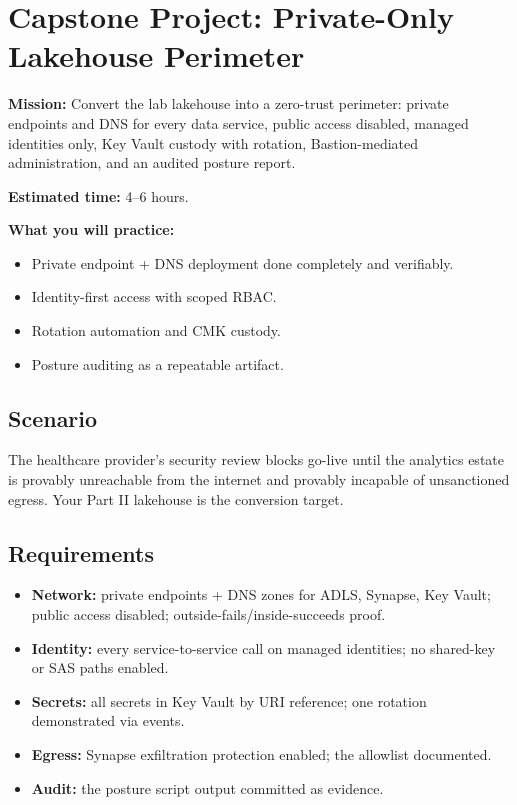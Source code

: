 \section{Capstone Project: Private-Only Lakehouse Perimeter}\label{sec:ch21-capstone}

\begin{capstonebox}
\textbf{Mission:} Convert the lab lakehouse into a zero-trust perimeter: private endpoints and DNS for every data service, public access disabled, managed identities only, Key Vault custody with rotation, Bastion-mediated administration, and an audited posture report.

\textbf{Estimated time:} 4--6 hours.

\textbf{What you will practice:}
\begin{itemize}
    \item Private endpoint + DNS deployment done completely and verifiably.
    \item Identity-first access with scoped RBAC.
    \item Rotation automation and CMK custody.
    \item Posture auditing as a repeatable artifact.
\end{itemize}
\end{capstonebox}

\subsection*{Scenario}
The healthcare provider's security review blocks go-live until the analytics estate is provably unreachable from the internet and provably incapable of unsanctioned egress. Your Part II lakehouse is the conversion target.

\subsection*{Requirements}
\begin{itemize}
    \item \textbf{Network:} private endpoints + DNS zones for ADLS, Synapse, Key Vault; public access disabled; outside-fails/inside-succeeds proof.
    \item \textbf{Identity:} every service-to-service call on managed identities; no shared-key or SAS paths enabled.
    \item \textbf{Secrets:} all secrets in Key Vault by URI reference; one rotation demonstrated via events.
    \item \textbf{Egress:} Synapse exfiltration protection enabled; the allowlist documented.
    \item \textbf{Audit:} the posture script output committed as evidence.
\end{itemize}

